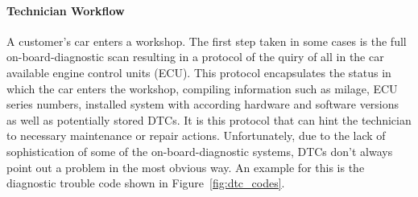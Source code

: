 \paragraph{Technician Workflow}
A customer's car enters a workshop. 
The first step taken in some cases is the full on-board-diagnostic scan resulting in a protocol of the quiry of all in the car available engine control units (ECU). 
This protocol encapsulates the status in which the car enters the workshop, compiling information such as milage, ECU series numbers, installed system with according hardware and software versions as well as potentially stored DTCs.
It is this protocol that can hint the technician to necessary maintenance or repair actions.
Unfortunately, due to the lack of sophistication of some of the on-board-diagnostic systems, DTCs don't always point out a problem in the most obvious way. 
An example for this is the diagnostic trouble code shown in Figure~\ref{fig:dtc_codes}.


